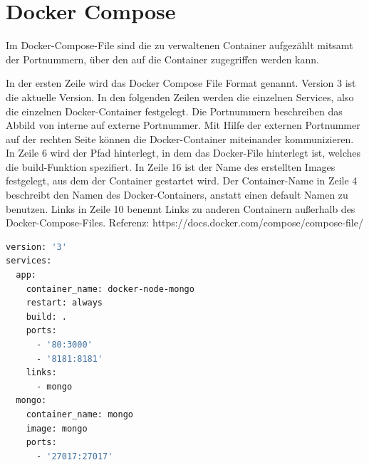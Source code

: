 \section{Docker Compose}\label{sec:Docker Compose}
Im Docker-Compose-File sind die zu verwaltenen Container aufgezählt mitsamt der Portnummern, über den auf die Container zugegriffen werden kann.

In der ersten Zeile wird das Docker Compose File Format genannt. Version 3 ist die aktuelle Version. In den folgenden Zeilen werden die einzelnen Services, also die einzelnen Docker-Container festgelegt.
Die Portnummern beschreiben das Abbild von interne auf externe Portnummer. Mit Hilfe der externen Portnummer auf der rechten Seite können die Docker-Container miteinander kommunizieren.
In Zeile 6 wird der Pfad hinterlegt, in dem das Docker-File hinterlegt ist, welches die build-Funktion spezifiert. 
In Zeile 16 ist der Name des erstellten Images festgelegt, aus dem der Container gestartet wird. Der Container-Name in Zeile 4 beschreibt den Namen des Docker-Containers, anstatt einen default Namen zu benutzen. Links in Zeile 10 benennt Links zu anderen Containern außerhalb des Docker-Compose-Files. Referenz: https://docs.docker.com/compose/compose-file/
\begin{lstlisting}[language=bash, caption={docker-compose.yml-File}, label=lis:POST]
version: '3'
services:
  app:
    container_name: docker-node-mongo
    restart: always
    build: .
    ports:
      - '80:3000'
      - '8181:8181'
    links:
      - mongo
  mongo:
    container_name: mongo
    image: mongo
    ports:
      - '27017:27017'


\end{lstlisting}


